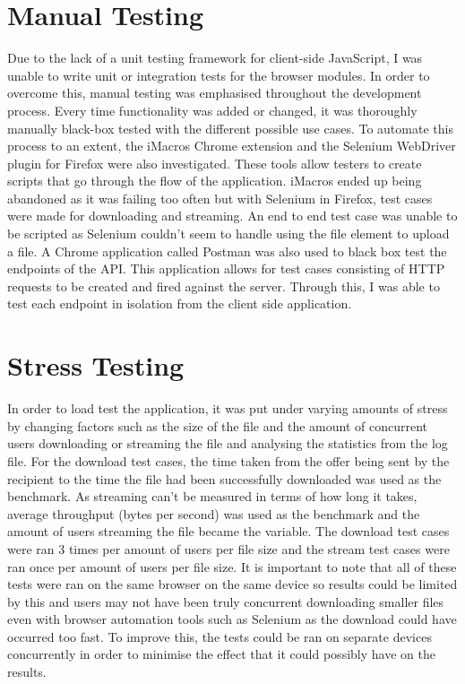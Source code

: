 \documentclass[]{report}
\begin{document}
		\section{Manual Testing}
			Due to the lack of a unit testing framework for client-side JavaScript, I was unable to write unit or integration tests for the browser modules. In order to overcome this, manual testing was emphasised throughout the development process. Every time functionality was added or changed, it was thoroughly manually black-box tested with the different possible use cases. To automate this process to an extent, the iMacros Chrome extension and the Selenium WebDriver plugin for Firefox were also investigated. These tools allow testers to create scripts that go through the flow of the application. iMacros ended up being abandoned as it was failing too often but with Selenium in Firefox, test cases were made for downloading and streaming. An end to end test case was unable to be scripted as Selenium couldn't seem to handle using the file element to upload a file. A Chrome application called Postman was also used to black box test the endpoints of the API. This application allows for test cases consisting of HTTP requests to be created and fired against the server. Through this, I was able to test each endpoint in isolation from the client side application. 
		
		\section{Stress Testing}
		In order to load test the application, it was put under varying amounts of stress by changing factors such as the size of the file and the amount of concurrent users downloading or streaming the file and analysing the statistics from the log file. For the download test cases, the time taken from the offer being sent by the recipient to the time the file had been successfully downloaded was used as the benchmark. As streaming can't be measured in terms of how long it takes, average throughput (bytes per second) was used as the benchmark and the amount of users streaming the file became the variable. The download test cases were ran 3 times per amount of users per file size and the stream test cases were ran once per amount of users per file size. It is important to note that all of these tests were ran on the same browser on the same device so results could be limited by this and users may not have been truly concurrent downloading smaller files even with browser automation tools such as Selenium as the download could have occurred too fast. To improve this, the tests could be ran on separate devices concurrently in order to minimise the effect that it could possibly have on the results.
		
\end{document}
